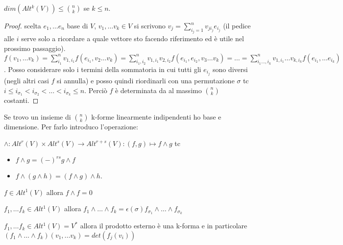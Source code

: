 \begin{lem}
    $dim(Alt^k(V))\leq\binom{n}{k}$ se $k\leq n$.
\end{lem}
\begin{proof}
    scelta $e_1,\dots e_n$ base di $V$, $v_1,\dots v_k\in V$ si
    scrivono $v_j=\sum_{i_j=1}^n v_{ji_j}e_{i_j}$ (il pedice
    alle $i$ serve solo a ricordare a quale vettore sto facendo
    riferimento ed è utile nel prossimo passaggio). 
    $f(v_1,\dots v_k)=
    \sum_{i_1}^n v_{1,i_1}f(e_{i_1},v_2\dots v_k)=
    \sum_{i_1,i_2}^n v_{1,i_1}v_{2,i_2}f(e_{i_1},e_{i_2}, 
    v_3\dots v_k)=\dots =
    \sum_{i_1\dots,i_k}^n v_{1,i_1}\dots v_{k,i_k} 
    f(e_{i_1},\dots e_{i_k})$. Posso considerare solo i termini
    della sommatoria in cui tutti gli $e_{i_j}$ sono diversi
    (negli altri casi $f$ si annulla) e posso quindi
    riordinarli con una permutazione $\sigma$ tc $i\leq
    i_{\sigma_1}<i_{\sigma_2}<\dots< i_{\sigma_k}\leq n$.
    Perciò $f$ è determinata da al massimo $\binom{n}{k}$ costanti.
\end{proof}
Se trovo un insieme di $\binom{n}{k}$ k-forme linearmente
indipendenti ho base e dimensione. Per farlo introduco
l'operazione: 
\begin{definition}
    $\wedge: Alt^r(V)\times Alt^s(V)\to Alt^{r+s}(V):(f,g)\mapsto
    f\wedge g$ tc
    \begin{itemize}
        \item $f\wedge g=(-)^{rs}g\wedge f$
        \item $f\wedge(g\wedge h)=(f\wedge g)\wedge h$.
    \end{itemize}
\end{definition}
\begin{obs}
    $f\in Alt^1(V)$ allora $f\wedge f=0$
\end{obs}
\begin{obs}
    $f_1,\dots f_k \in Alt^1(V)$ allora 
    $f_1\wedge\dots\wedge f_k =
    \epsilon(\sigma)f_{\sigma_1}\wedge\dots\wedge f_{\sigma_k}$
\end{obs}
\begin{obs}
    $f_1,\dots f_k \in Alt^1(V)=V^*$ allora il prodotto esterno è
    una k-forma e in particolare
    $(f_1\wedge\dots\wedge f_k)(v_1,... v_k)=det(f_j(v_i))$ 
\end{obs}

